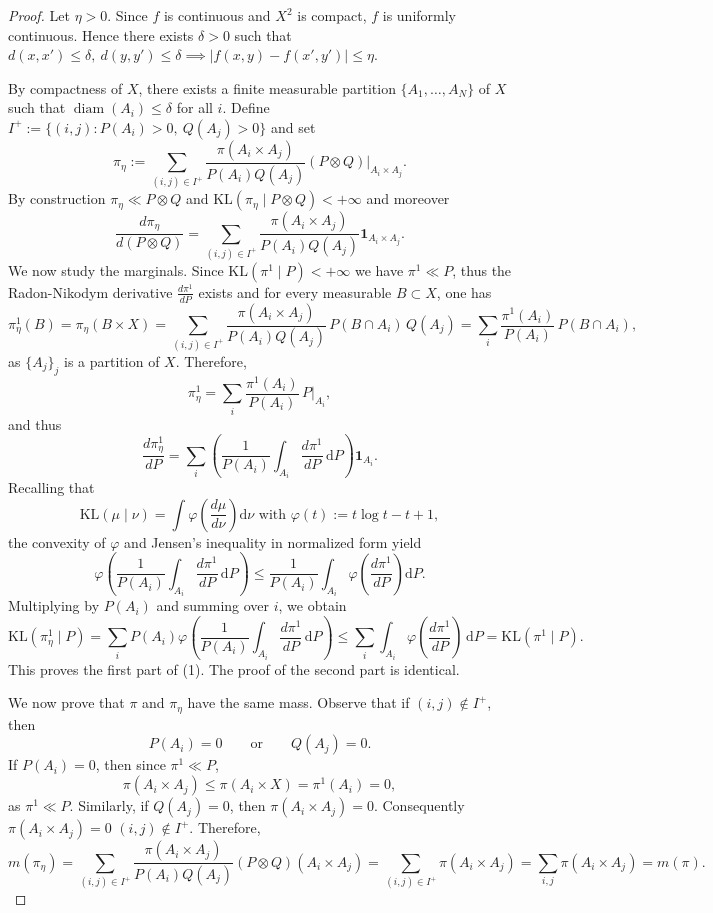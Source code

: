 \documentclass[10pt,a4paper]{amsart}
\begin{document}
\begin{proof}
Let \(\eta>0\). Since $f$ is continuous and \(X^2\) is compact, \(f\) is uniformly continuous. Hence there exists \(\delta>0\) such that
$d(x,x')\le \delta, ~ d(y,y') \le \delta \implies 
|f(x,y)-f(x',y')|
\le \eta.$

By compactness of \(X\), there exists a finite measurable partition
$\{A_1,\dots,A_N\}$
of \(X\) such that
$
\operatorname{diam}(A_i)\le \delta$ for all $i$.
Define
$I^+
:=
\{(i,j): P(A_i)>0,\ Q(A_j)>0\}$ 
and set
\[
\pi_\eta
:=
\sum_{(i,j)\in I^+}
\frac{\pi(A_i\times A_j)}{P(A_i)Q(A_j)}
(P\otimes Q)|_{A_i\times A_j}.
\]
By construction $\pi_\eta \ll P \otimes Q$ and $\mathrm{KL}(\pi_\eta\mid P\otimes Q)<+\infty$ and moreover
\[
\frac{d\pi_\eta}{d(P\otimes Q)}
=
\sum_{(i,j)\in I^+}
\frac{\pi(A_i\times A_j)}{P(A_i)Q(A_j)}
\mathbf 1_{A_i\times A_j}.
\]
We now study the marginals. Since
$\mathrm{KL}(\pi^1\mid P)<+\infty$
we have \(\pi^1\ll P\), thus the Radon-Nikodym derivative $\frac{d\pi^1}{dP}$
exists and for every measurable \(B\subset X\), one has
\[
\pi_\eta^1(B) =
\pi_\eta(B\times X) =
\sum_{(i,j)\in I^+}
\frac{\pi(A_i\times A_j)}{P(A_i)Q(A_j)}
\,P(B\cap A_i)\,Q(A_j)=
\sum_i
\frac{\pi^1(A_i)}{P(A_i)}
\,P(B\cap A_i),
\]
as \(\{A_j\}_j\) is a partition of \(X\). Therefore,
\[
\pi_\eta^1
=
\sum_i
\frac{\pi^1(A_i)}{P(A_i)}
\,P|_{A_i},
\]
and thus
\[
\frac{d\pi_\eta^1}{dP}
=
\sum_i
\left(
\frac1{P(A_i)}
\int_{A_i}\frac{d\pi^1}{dP}\, \mathrm{d}P
\right)\mathbf 1_{A_i}.
\]
Recalling that
\[
\mathrm{KL}(\mu\mid \nu)
=
\int
\varphi\!\left(\frac{d\mu}{d\nu}\right)\mathrm{d}\nu
\text{ with }
\varphi(t):= t\log t - t +1,
\]
the convexity of \(\varphi\) and Jensen's inequality in normalized form yield
\[
\varphi\!\left(
\frac1{P(A_i)}
\int_{A_i}\frac{d\pi^1}{dP}\, \mathrm{d}P
\right)
\le
\frac1{P(A_i)}
\int_{A_i}
\varphi \left(\frac{d\pi^1}{dP}\right) \mathrm{d}P.
\]
Multiplying by \(P(A_i)\) and summing over \(i\), we obtain
\[
\mathrm{KL}(\pi_\eta^1\mid P)
=
\sum_i
P(A_i)
\varphi\!\left(
\frac1{P(A_i)}
\int_{A_i}\frac{d\pi^1}{dP}\, \mathrm{d}P
\right) 
\le
\sum_i
\int_{A_i}
\varphi \left(\frac{d\pi^1}{dP}\right)\, \mathrm{d}P 
=
\mathrm{KL}(\pi^1\mid P).
\]
This proves the first part of (1). The proof of the second part is identical.

We now prove that $\pi$ and $\pi_\eta$ have the same mass. Observe that if \((i,j)\notin I^+\), then
\[
P(A_i)=0
\qquad
\text{or}
\qquad
Q(A_j)=0.
\]
If \(P(A_i)=0\), then since \(\pi^1\ll P\),
\[
\pi(A_i\times A_j)
\le
\pi(A_i\times X)
=
\pi^1(A_i)
=
0,
\]
as \(\pi^1\ll P\).
Similarly, if \(Q(A_j)=0\), then $\pi(A_i\times A_j)=0$.
Consequently $
\pi(A_i\times A_j)=0$
$(i,j)\notin I^+$.
Therefore,
\[
m(\pi_\eta)
=
\sum_{(i,j)\in I^+}
\frac{\pi(A_i\times A_j)}{P(A_i)Q(A_j)}
(P\otimes Q)(A_i\times A_j) 
=
\sum_{(i,j)\in I^+}
\pi(A_i\times A_j) 
=
\sum_{i,j}
\pi(A_i\times A_j) 
=
m(\pi).
\]


\end{proof}
\end{document}
